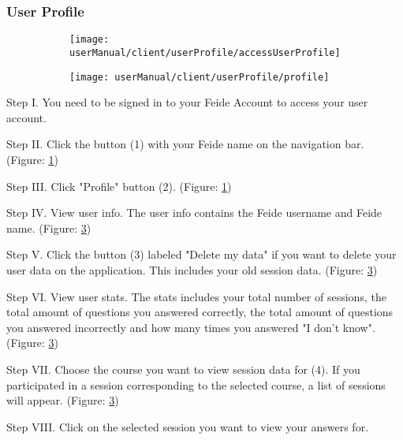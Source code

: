 \subsubsection{User Profile}
\begin{figure}[H]
	\begin{subfigure}{0.80\linewidth}
		\texttt{[image: userManual/client/userProfile/accessUserProfile]}
		\caption{}
		\label{fig:accessUserProfile}	
	\end{subfigure}
	\begin{subfigure}{0.80\linewidth}
		\texttt{[image: userManual/client/userProfile/profile]}
		\caption{}
		\label{fig:profilePage}
	\end{subfigure}
\end{figure}

\begin{userManualItemlist}
	\item[Step I.] You need to be signed in to your Feide Account to access your user account. 
	\item[Step II.] Click the button (1) with your Feide name on the navigation bar. (Figure: \ref{fig:accessUserProfile})
	\item[Step III.] Click "Profile" button (2). (Figure: \ref{fig:accessUserProfile})
	\item[Step IV.] View user info. The user info contains the Feide username and Feide name. (Figure: \ref{fig:profilePage})
	\item[Step V.] Click the button (3) labeled "Delete my data" if you want to delete your user data on the application. This includes your old session data. (Figure: \ref{fig:profilePage})
	\item[Step VI.] View user stats. The stats includes your total number of sessions, the total amount of questions you answered correctly, the total amount of questions you answered incorrectly and how many times you answered "I don't know". (Figure: \ref{fig:profilePage})
	\item[Step VII.] Choose the course you want to view session data for (4). If you participated in a session corresponding to the selected course, a list of sessions will appear. (Figure: \ref{fig:profilePage})
	\item[Step VIII.] Click on the selected session you want to view your answers for.
\end{userManualItemlist}
